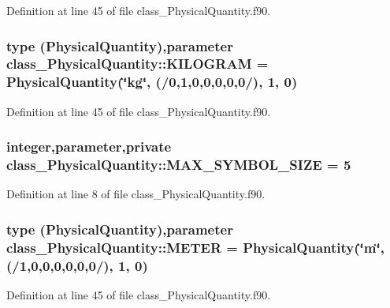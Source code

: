 Definition at line 45 of file class\_\-PhysicalQuantity.f90.

\hypertarget{namespaceclass__PhysicalQuantity_a902db03da895ab4c528d71d99e8549b0}{
\subsubsection[{KILOGRAM}]{\setlength{\rightskip}{0pt plus 5cm}type ({\bf PhysicalQuantity}),parameter {\bf class\_\-PhysicalQuantity::KILOGRAM} = {\bf PhysicalQuantity}(\char`\"{}kg\char`\"{}, (/0,1,0,0,0,0,0/), 1, 0)}}
\label{namespaceclass__PhysicalQuantity_a902db03da895ab4c528d71d99e8549b0}


Definition at line 45 of file class\_\-PhysicalQuantity.f90.

\hypertarget{namespaceclass__PhysicalQuantity_a2870256032bca15f690a32ce1d1b6c52}{
\subsubsection[{MAX\_\-SYMBOL\_\-SIZE}]{\setlength{\rightskip}{0pt plus 5cm}integer,parameter,private {\bf class\_\-PhysicalQuantity::MAX\_\-SYMBOL\_\-SIZE} = 5}}
\label{namespaceclass__PhysicalQuantity_a2870256032bca15f690a32ce1d1b6c52}


Definition at line 8 of file class\_\-PhysicalQuantity.f90.

\hypertarget{namespaceclass__PhysicalQuantity_a0633cd9b4645d04d7d47dbd151837757}{
\subsubsection[{METER}]{\setlength{\rightskip}{0pt plus 5cm}type ({\bf PhysicalQuantity}),parameter {\bf class\_\-PhysicalQuantity::METER} = {\bf PhysicalQuantity}(\char`\"{}m\char`\"{}, (/1,0,0,0,0,0,0/), 1, 0)}}
\label{namespaceclass__PhysicalQuantity_a0633cd9b4645d04d7d47dbd151837757}


Definition at line 45 of file class\_\-PhysicalQuantity.f90.

